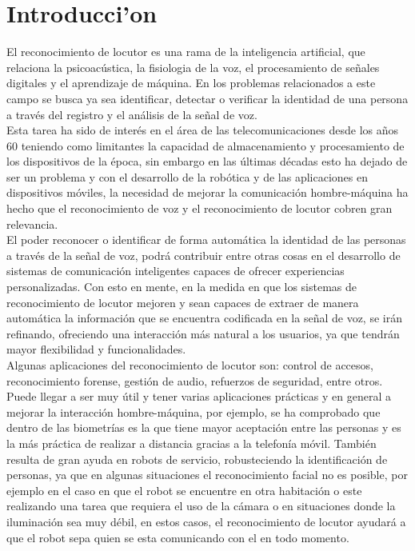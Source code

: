 \chapter{Introducci'on} \label{chap:introduccion}

El reconocimiento de locutor es una rama de la inteligencia artificial, que relaciona la psicoac\'ustica, la fisiologia de la voz, el procesamiento de señales digitales y el aprendizaje de m\'aquina. En los problemas relacionados a este campo se busca ya sea identificar, detectar o verificar la identidad de una persona a trav\'es del registro y el an\'alisis de la señal de voz.\\

Esta tarea ha sido de inter\'es en el \'area de las telecomunicaciones desde los años 60 \cite{history2004} teniendo como limitantes la capacidad de almacenamiento y procesamiento de los dispositivos de la \'epoca, sin embargo en las \'ultimas d\'ecadas esto ha dejado de ser un problema y con el desarrollo de la rob\'otica y de las aplicaciones en dispositivos m\'oviles, la necesidad de mejorar la comunicaci\'on hombre-m\'aquina ha hecho que el reconocimiento de voz y el reconocimiento de locutor cobren gran relevancia. \\

El poder reconocer o identificar de forma autom\'atica la identidad de las personas a trav\'es de la señal de voz, podr\'a contribuir entre otras cosas en el desarrollo de sistemas de comunicaci\'on inteligentes capaces de ofrecer experiencias personalizadas. Con esto en mente, en la medida en que los sistemas de reconocimiento de locutor mejoren y sean capaces de extraer de manera autom\'atica la informaci\'on que se encuentra codificada en la señal de voz, se ir\'an refinando, ofreciendo una interacci\'on m\'as natural a los usuarios, ya que tendr\'an mayor flexibilidad y funcionalidades.\\

Algunas aplicaciones del reconocimiento de locutor son: control de accesos, reconocimiento forense, gestión de audio, refuerzos de seguridad, entre otros. Puede llegar a ser muy útil y tener varias aplicaciones prácticas y en general a mejorar la interacci\'on hombre-m\'aquina, por ejemplo, se ha comprobado que dentro de las biometr\'ias es la que tiene mayor aceptación entre  las personas y es la m\'as pr\'actica de realizar a distancia gracias a la telefon\'ia m\'ovil. Tambi\'en resulta de gran ayuda en robots de servicio, robusteciendo la identificaci\'on de personas, ya que en algunas situaciones el reconocimiento facial no es posible, por ejemplo en el caso en que el robot se encuentre en otra habitaci\'on o este realizando una tarea que requiera el uso de la c\'amara o en situaciones donde la iluminaci\'on sea muy d\'ebil, en estos casos, el reconocimiento de locutor ayudar\'a a que el robot sepa quien se esta comunicando con el en todo momento.\\

